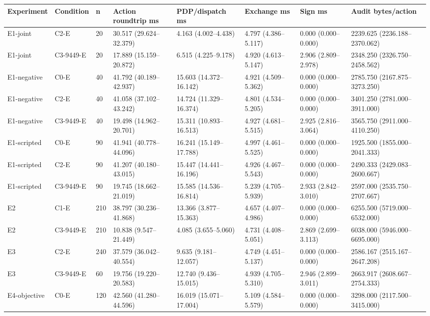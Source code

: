 \begin{tabular}{llllllll}
\hline
Experiment & Condition & n & Action roundtrip ms & PDP/dispatch ms & Exchange ms & Sign ms & Audit bytes/action \\
\hline
E1-joint & C2-E & 20 & 30.517 (29.624--32.379) & 4.163 (4.002--4.438) & 4.797 (4.386--5.117) & 0.000 (0.000--0.000) & 2239.625 (2236.188--2370.062) \\
E1-joint & C3-9449-E & 20 & 17.889 (15.159--20.872) & 6.515 (4.225--9.178) & 4.920 (4.613--5.147) & 2.906 (2.809--2.978) & 2348.250 (2326.750--2458.562) \\
E1-negative & C0-E & 40 & 41.792 (40.189--42.937) & 15.603 (14.372--16.142) & 4.921 (4.509--5.362) & 0.000 (0.000--0.000) & 2785.750 (2167.875--3273.250) \\
E1-negative & C2-E & 40 & 41.058 (37.102--43.242) & 14.724 (11.329--16.374) & 4.801 (4.534--5.205) & 0.000 (0.000--0.000) & 3401.250 (2781.000--3911.000) \\
E1-negative & C3-9449-E & 40 & 19.498 (14.962--20.701) & 15.311 (10.893--16.513) & 4.927 (4.681--5.515) & 2.925 (2.816--3.064) & 3565.750 (2911.000--4110.250) \\
E1-scripted & C0-E & 90 & 41.941 (40.778--44.096) & 16.241 (15.149--17.788) & 4.997 (4.461--5.525) & 0.000 (0.000--0.000) & 1925.500 (1855.000--2041.333) \\
E1-scripted & C2-E & 90 & 41.207 (40.180--43.015) & 15.447 (14.441--16.196) & 4.926 (4.467--5.543) & 0.000 (0.000--0.000) & 2490.333 (2429.083--2600.667) \\
E1-scripted & C3-9449-E & 90 & 19.745 (18.662--21.019) & 15.585 (14.536--16.814) & 5.239 (4.705--5.939) & 2.933 (2.842--3.010) & 2597.000 (2535.750--2707.667) \\
E2 & C1-E & 210 & 38.797 (30.236--41.868) & 13.366 (3.877--15.363) & 4.657 (4.407--4.986) & 0.000 (0.000--0.000) & 6255.500 (5719.000--6532.000) \\
E2 & C3-9449-E & 210 & 10.838 (9.547--21.449) & 4.085 (3.655--5.060) & 4.731 (4.408--5.051) & 2.869 (2.699--3.113) & 6038.000 (5946.000--6695.000) \\
E3 & C2-E & 240 & 37.579 (36.042--40.554) & 9.635 (9.181--12.057) & 4.749 (4.451--5.137) & 0.000 (0.000--0.000) & 2586.167 (2515.167--2647.208) \\
E3 & C3-9449-E & 60 & 19.756 (19.220--20.583) & 12.740 (9.436--15.015) & 4.939 (4.705--5.310) & 2.946 (2.899--3.011) & 2663.917 (2608.667--2754.333) \\
E4-objective & C0-E & 120 & 42.560 (41.280--44.596) & 16.019 (15.071--17.004) & 5.109 (4.584--5.579) & 0.000 (0.000--0.000) & 3298.000 (2117.500--3415.000) \\

\end{tabular}
